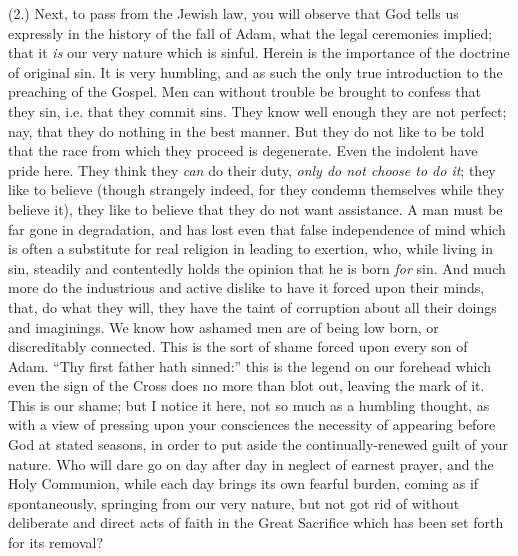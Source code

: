 (2.) Next, to pass from the Jewish law, you will
observe that God tells us expressly in the history of the
fall of Adam, what the legal ceremonies implied; that it \emph{is}
our very nature which is sinful. Herein is the importance
of the doctrine of original sin. It is very humbling, and
as such the only true introduction to the preaching of
the Gospel. Men can without trouble be brought to confess
that they sin, i.e. that they commit sins. They know well
enough they are not perfect; nay, that they do nothing in
the best manner. But they do not like to be told that the
race from which they proceed is degenerate. Even the
indolent have pride here. They think they \emph{can} do
their duty, \emph{only do not choose to do it}; they like
to believe (though strangely indeed, for they condemn
themselves while they believe it), they like to believe
that they do not want assistance. A man must be far gone
in degradation, and has lost even that false independence
of mind which is often a substitute for real religion in
leading to exertion, who, while living in sin, steadily
and contentedly holds the opinion that he is born \emph{for}
sin. And much more do the industrious and active dislike
to have it forced upon their minds, that, do what they
will, they have the taint of corruption about all their
doings and imaginings. We know how ashamed men are of
being low born, or discreditably connected. This is the
sort of shame forced upon every son of Adam. ``Thy
first father hath sinned:'' this is the legend on our
forehead which even the sign of the Cross does no more
than blot out, leaving the mark of it. This is our shame;
but I notice it here, not so much as a humbling thought,
as with a view of pressing upon your consciences the
necessity of appearing before God at stated seasons, in
order to put aside the continually-renewed guilt of your
nature. Who will dare go on day after day in neglect of
earnest prayer, and the Holy Communion, while each day
brings its own fearful burden, coming as if
spontaneously, springing from our very nature, but not
got rid of without deliberate and direct acts of faith in
the Great Sacrifice which has been set forth for its
removal?

